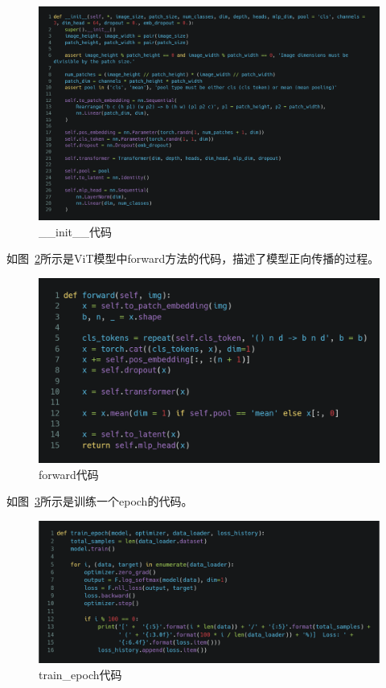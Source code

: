 \documentclass[UTF8]{ctexrep}
\begin{document}
\begin{figure}[htbp]
    \centering
    \includegraphics[width=0.9\linewidth]{init.png}
    \caption{\_\_init\_\_代码}
    \label{fig:init}
\end{figure}

如图~\ref{fig:forward}所示是ViT模型中forward方法的代码，描述了模型正向传播的过程。

\begin{figure}[htbp]
    \centering
    \includegraphics[width=0.9\linewidth]{forward.png}
    \caption{forward代码}
    \label{fig:forward}
\end{figure}

如图~\ref{fig:train-epoch}所示是训练一个epoch的代码。

\begin{figure}[htbp]
    \centering
    \includegraphics[width=0.9\linewidth]{train-epoch.png}
    \caption{train\_epoch代码}
    \label{fig:train-epoch}
\end{figure}
\end{document}
